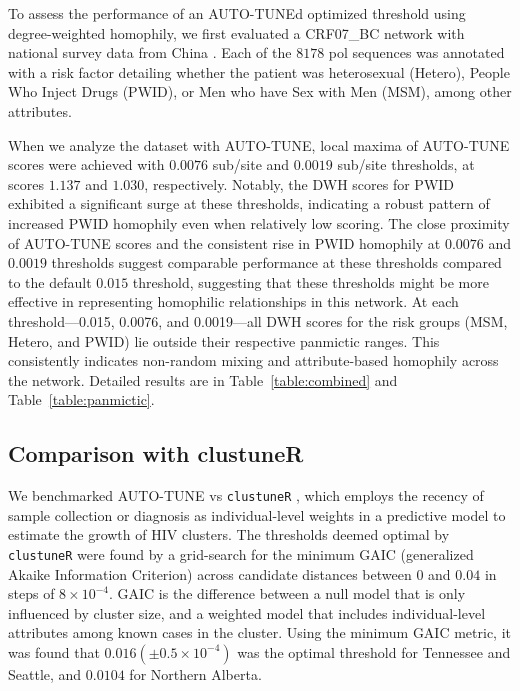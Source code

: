 \documentclass[utf8]{FrontiersinHarvard} %
\newcommand{\TODO}[1]{{\color{red}{#1}}}
\begin{document}
To assess the performance of an AUTO-TUNEd optimized threshold using
degree-weighted homophily, we first evaluated a CRF07\_BC network with national
survey data from China \cite{Ge:2021aa} . Each of the $8178$ pol sequences was
annotated with a risk factor detailing whether the patient was heterosexual
(Hetero), People Who Inject Drugs (PWID), or Men who have Sex with Men (MSM),
among other attributes.

When we analyze the dataset with AUTO-TUNE, local maxima of AUTO-TUNE scores
were achieved with $0.0076$ sub/site and $0.0019$ sub/site thresholds, at scores $1.137$ and $1.030$,
respectively. Notably, the DWH scores for PWID exhibited a significant surge at
these thresholds, indicating a robust pattern of increased PWID homophily even
when relatively low scoring. The close proximity of AUTO-TUNE scores and the
consistent rise in PWID homophily at $0.0076$ and $0.0019$ thresholds suggest
comparable performance at these thresholds compared to the default $0.015$
threshold, suggesting that these thresholds might be more effective in
representing homophilic relationships in this network. At each threshold—0.015,
0.0076, and 0.0019—all DWH scores for the risk groups (MSM, Hetero, and PWID)
lie outside their respective panmictic ranges. This consistently indicates
non-random mixing and attribute-based homophily across the network. Detailed
results are in Table~\ref{table:combined} and Table~\ref{table:panmictic}.

\TODO{VDC: it also makes sense epidemiologically that PWID (usually outbreaks) have lower scores (than 1.5\%) due to faster transmission or case identification, while aligning with the homophlilic pattern.}
\TODO{SW: VDC, do you have a reference for this?.}

\subsection{Comparison with clustuneR}

We benchmarked AUTO-TUNE vs {\tt clustuneR} \cite{chato_public_2020}, which
employs the recency of sample collection or diagnosis as individual-level
weights in a predictive model to estimate the growth of HIV clusters. The
thresholds deemed optimal by {\tt clustuneR} were found by a grid-search for
the minimum GAIC (generalized Akaike Information Criterion) across candidate
distances between $0$ and $0.04$ in steps of $8 \times 10^{-4}$. GAIC is the
difference between a null model that is only influenced by cluster size, and a
weighted model that includes individual-level attributes among known cases in
the cluster. Using the minimum GAIC metric, it was found that $0.016 (\pm
	0.5\times 10^{-4})$ was the optimal threshold for Tennessee and Seattle, and
$0.0104$ for Northern Alberta.
\end{document}
